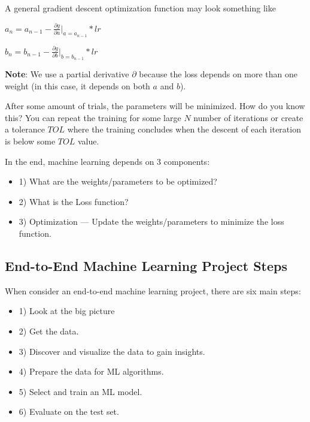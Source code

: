 {A general gradient descent optimization function may look something like

\vspace{11pt}
\begin{center}
    $a_n=a_{n-1}-\frac{\partial g}{\partial a}|_{a=a_{n-1}} * lr$

    $b_n=b_{n-1}-\frac{\partial g}{\partial b}|_{b=b_{n-1}} * lr$
\end{center}
\vspace{11pt}

\begin{aside}
    \textbf{Note}: We use a partial derivative $\partial$ because the loss depends on more than one weight (in this case, it depends on both $a$ and $b$).
\end{aside}
\vspace{11pt}

After some amount of trials, the parameters will be minimized. How do you know this? You can repeat the training for some large $N$ number of iterations or create a tolerance $TOL$ where the training concludes when the descent of each iteration is below some $TOL$ value.

In the end, machine learning depends on 3 components:
\begin{itemize}
    \item 1) What are the weights/parameters to be optimized?
    \item 2) What is the Loss function?
    \item 3) Optimization --- Update the weights/parameters to minimize the loss function.
\end{itemize}
\vspace{11pt}



\subsection{End-to-End Machine Learning Project Steps}
\vspace{11pt}

When consider an end-to-end machine learning project, there are six main steps:
\begin{itemize}
    \item 1) Look at the big picture
    \item 2) Get the data.
    \item 3) Discover and visualize the data to gain insights.
    \item 4) Prepare the data for ML algorithms.
    \item 5) Select and train an ML model.
    \item 6) Evaluate on the test set.
\end{itemize}
\vspace{11pt}

}
